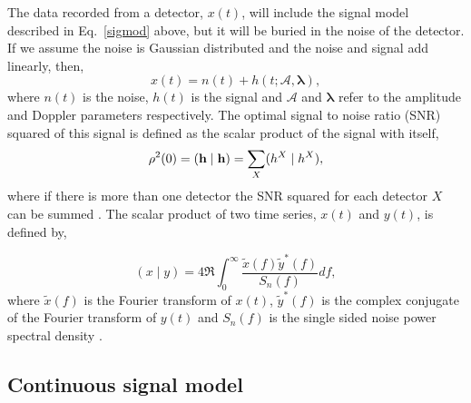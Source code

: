 The data recorded from a detector, $x(t)$, will include the signal model described in Eq.~\ref{sigmod} above, but it will be buried in the noise of the detector. 
If we assume the noise is Gaussian distributed and the noise and signal add linearly, then,  
\begin{equation}
\label{signalinnoise}
x(t) = n(t) + h(t; \mathcal{A},{\boldsymbol \lambda}) ,
\end{equation}
where $n(t)$ is the noise, $h(t)$ is the signal and $\mathcal{A}$ and ${\boldsymbol \lambda}$ refer to the amplitude and Doppler parameters respectively. 
The optimal signal to noise ratio (SNR) squared of this signal is defined as the scalar product of the signal with itself,
\begin{equation}
\rho^2(0) = ({\bf h} \mid {\bf h}) = \sum_X(h^X \mid h^X),
\end{equation}
where if there is more than one detector the SNR squared for each detector $X$ can be summed \cite{Prix2007}. 
The scalar product of two time series, $x(t)$ and $y(t)$, is defined by,

\begin{equation}
\label{intro:search:signals:scalarproduct}
(x \mid y) = 4 \Re \int_{0}^{\infty} \frac{\tilde{x}(f)\tilde{y}^{*}(f)}{S_n(f)}df,
\end{equation}
where $\tilde{x}(f)$ is the Fourier transform of $x(t)$, $\tilde{y}^{*}(f)$ is the complex conjugate of the Fourier transform of $y(t)$ and $S_n(f)$ is the single sided noise power spectral density \cite{Prix2007}.


\subsection{\label{intro:search:model}Continuous signal model}

